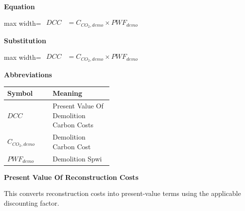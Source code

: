 \documentclass{article}
\begin{document}
\vspace{0.4em}
\textbf{Equation}\par\vspace{-0.35em}
\begin{center}
\begin{adjustbox}{max width=\linewidth}
$\displaystyle\begin{aligned}
DCC &= C_{CO_2,demo} \times PWF_{demo}
\end{aligned}$
\end{adjustbox}
\end{center}
\vspace{0.4em}
\textbf{Substitution}\par\vspace{-0.35em}
\begin{center}
\begin{adjustbox}{max width=\linewidth}
$\displaystyle\begin{aligned}
DCC &= C_{CO_2,demo} \times PWF_{demo}
\end{aligned}$
\end{adjustbox}
\end{center}
\vspace{0.4em}
\textbf{Abbreviations}\par\vspace{-0.35em}
\begin{tabularx}{\linewidth}{>{\raggedright\arraybackslash}p{0.43\linewidth} >{\raggedright\arraybackslash}X}
\toprule
Symbol & Meaning \\
\midrule
$DCC$ & Present Value Of Demolition Carbon Costs \\
$C_{CO_2,demo}$ & Demolition Carbon Cost \\
$PWF_{demo}$ & Demolition Spwi \\
\bottomrule
\end{tabularx}
\vspace{0.6em}
\vspace{0.4em}
\textbf{Present Value Of Reconstruction Costs}\par\vspace{-0.35em}
This converts reconstruction costs into present-value terms using the applicable discounting factor.
\end{document}

